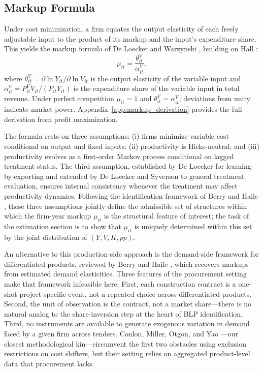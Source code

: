 \documentclass[11pt]{article}
\begin{document}
\subsection{Markup Formula}\label{sec:markup_formula}

Under cost minimization, a firm equates the output elasticity of each freely adjustable input to the product of its markup and the input's expenditure share. This yields the markup formula of De Loecker and Warzynski \cite{DLW2012}, building on Hall \cite{Hall1988}:
\begin{equation}\label{eq:markup}
    \mu_{it} = \frac{\theta^V_{it}}{\alpha^V_{it}},
\end{equation}
where $\theta^V_{it} = \partial \ln Y_{it} / \partial \ln V_{it}$ is the output elasticity of the variable input and $\alpha^V_{it} = P^V_{it} V_{it} / (P_{it} Y_{it})$ is the expenditure share of the variable input in total revenue. Under perfect competition $\mu_{it} = 1$ and $\theta^V_{it} = \alpha^V_{it}$; deviations from unity indicate market power. Appendix~\ref{app:markup_derivation} provides the full derivation from profit maximization.

The formula rests on three assumptions: (i) firms minimize variable cost conditional on output and fixed inputs; (ii) productivity is Hicks-neutral; and (iii) productivity evolves as a first-order Markov process conditional on lagged treatment status. The third assumption, established by De Loecker \cite{DeLoecker2013} for learning-by-exporting and extended by De Loecker and Syverson \cite{DLS2021} to general treatment evaluation, ensures internal consistency whenever the treatment may affect productivity dynamics. Following the identification framework of Berry and Haile \cite{BerryHaile2018}, these three assumptions jointly define the admissible set of structures within which the firm-year markup $\mu_{it}$ is the structural feature of interest; the task of the estimation section is to show that $\mu_{it}$ is uniquely determined within this set by the joint distribution of $(Y, V, K, pp)$.

An alternative to this production-side approach is the demand-side framework for differentiated products, reviewed by Berry and Haile \cite{BerryHaile2018}, which recovers markups from estimated demand elasticities. Three features of the procurement setting make that framework infeasible here. First, each construction contract is a one-shot project-specific event, not a repeated choice across differentiated products. Second, the unit of observation is the contract, not a market share---there is no natural analog to the share-inversion step at the heart of BLP identification. Third, no instruments are available to generate exogenous variation in demand faced by a given firm across tenders. Conlon, Miller, Otgon, and Yao \cite{CMOY2023}---our closest methodological kin---circumvent the first two obstacles using exclusion restrictions on cost shifters, but their setting relies on aggregated product-level data that procurement lacks.
\end{document}
